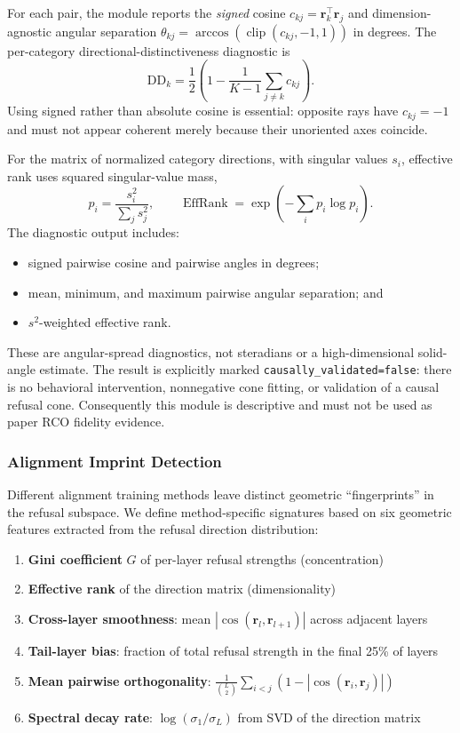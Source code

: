 \documentclass[11pt]{article}
\begin{document}
For each pair, the module reports the \emph{signed} cosine $c_{kj}=\mathbf{r}_k^\top\mathbf{r}_j$ and dimension-agnostic angular separation $\theta_{kj}=\arccos(\operatorname{clip}(c_{kj},-1,1))$ in degrees. The per-category directional-distinctiveness diagnostic is
\begin{equation}
    \text{DD}_k = \frac{1}{2}\left(1-\frac{1}{K-1}\sum_{j\neq k}c_{kj}\right).
\end{equation}
Using signed rather than absolute cosine is essential: opposite rays have $c_{kj}=-1$ and must not appear coherent merely because their unoriented axes coincide.

For the matrix of normalized category directions, with singular values $s_i$, effective rank uses squared singular-value mass,
\begin{equation}
    p_i=\frac{s_i^2}{\sum_j s_j^2}, \qquad
    \operatorname{EffRank}=\exp\left(-\sum_i p_i\log p_i\right).
\end{equation}
The diagnostic output includes:
\begin{itemize}
    \item signed pairwise cosine and pairwise angles in degrees;
    \item mean, minimum, and maximum pairwise angular separation; and
    \item $s^2$-weighted effective rank.
\end{itemize}
These are angular-spread diagnostics, not steradians or a high-dimensional solid-angle estimate. The result is explicitly marked \texttt{causally\_validated=false}: there is no behavioral intervention, nonnegative cone fitting, or validation of a causal refusal cone. Consequently this module is descriptive and must not be used as paper RCO fidelity evidence.

\subsubsection{Alignment Imprint Detection}
\label{sec:alignment_imprint}

Different alignment training methods leave distinct geometric ``fingerprints'' in the refusal subspace. We define method-specific signatures based on six geometric features extracted from the refusal direction distribution:

\begin{enumerate}
    \item \textbf{Gini coefficient} $G$ of per-layer refusal strengths (concentration)
    \item \textbf{Effective rank} of the direction matrix (dimensionality)
    \item \textbf{Cross-layer smoothness}: mean $|\cos(\mathbf{r}_l, \mathbf{r}_{l+1})|$ across adjacent layers
    \item \textbf{Tail-layer bias}: fraction of total refusal strength in the final 25\% of layers
    \item \textbf{Mean pairwise orthogonality}: $\frac{1}{\binom{L}{2}}\sum_{i<j}(1 - |\cos(\mathbf{r}_i, \mathbf{r}_j)|)$
    \item \textbf{Spectral decay rate}: $\log(\sigma_1 / \sigma_L)$ from SVD of the direction matrix
\end{enumerate}
\end{document}
